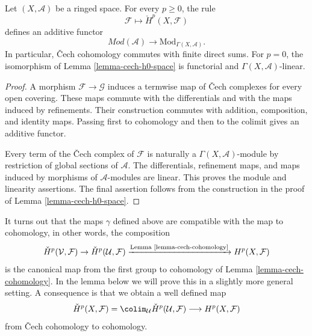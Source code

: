 \begin{lemma}
\label{lemma-cech-cohomology-additive}
\begin{reference}
\cite[Chapter I, \S 3, no. 23, pp. 215--216]{FAC}
\end{reference}
Let $(X, \mathcal{A})$ be a ringed space. For every $p \geq 0$, the rule
$$
\mathcal{F} \longmapsto \check{H}^p(X, \mathcal{F})
$$
defines an additive functor
$$
\textit{Mod}(\mathcal{A})
\longrightarrow
\text{Mod}_{\Gamma(X, \mathcal{A})}.
$$
In particular, {\v C}ech cohomology commutes with finite direct sums.
For $p = 0$, the isomorphism of Lemma \ref{lemma-cech-h0-space} is
functorial and $\Gamma(X, \mathcal{A})$-linear.
\end{lemma}

\begin{proof}
A morphism $\mathcal{F} \to \mathcal{G}$ induces a termwise map of
{\v C}ech complexes for every open covering. These maps commute with the
differentials and with the maps induced by refinements. Their construction
commutes with addition, composition, and identity maps. Passing first to
cohomology and then to the colimit gives an additive functor.

Every term of the {\v C}ech complex of $\mathcal{F}$ is naturally a
$\Gamma(X, \mathcal{A})$-module by restriction of global sections of
$\mathcal{A}$. The differentials, refinement maps, and maps induced by
morphisms of $\mathcal{A}$-modules are linear. This proves the module and
linearity assertions. The final assertion follows from the construction
in the proof of Lemma \ref{lemma-cech-h0-space}.
\end{proof}

\medskip\noindent
It turns out that the maps $\gamma$ defined above are compatible with
the map to cohomology, in other words, the composition
$$
\check{H}^p(\mathcal{V}, \mathcal{F}) \to
\check{H}^p(\mathcal{U}, \mathcal{F})
\xrightarrow{\text{Lemma \ref{lemma-cech-cohomology}}}
H^p(X, \mathcal{F})
$$
is the canonical map from the first group to cohomology of
Lemma \ref{lemma-cech-cohomology}.
In the lemma below we will prove this in a slightly more general
setting. A consequence is that we obtain a well defined map
\begin{equation}
\label{equation-cech-to-cohomology}
\check{H}^p(X, \mathcal{F}) =
\colim_\mathcal{U} \check{H}^p(\mathcal{U}, \mathcal{F})
\longrightarrow
H^p(X, \mathcal{F})
\end{equation}
from {\v C}ech cohomology to cohomology.

